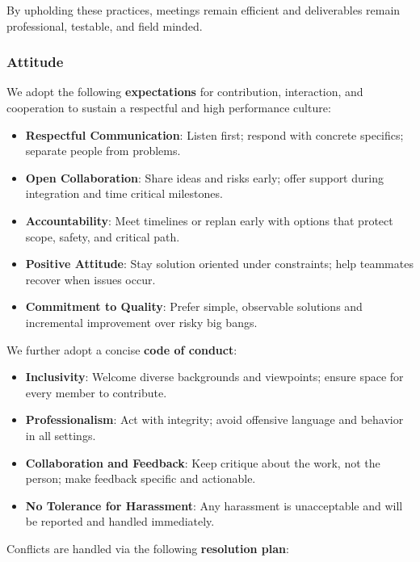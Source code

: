 \documentclass{article}
\begin{document}
\noindent
By upholding these practices, meetings remain efficient and deliverables remain
professional, testable, and field minded.

\subsubsection*{\color{blue}Attitude}

We adopt the following \textbf{expectations} for contribution, interaction, and
cooperation to sustain a respectful and high performance culture:

\begin{itemize}
  \item \textbf{Respectful Communication}: Listen first; respond with concrete
    specifics; separate people from problems.
  \item \textbf{Open Collaboration}: Share ideas and risks early; offer support
    during integration and time critical milestones.
  \item \textbf{Accountability}: Meet timelines or replan early with options
    that protect scope, safety, and critical path.
  \item \textbf{Positive Attitude}: Stay solution oriented under constraints;
    help teammates recover when issues occur.
  \item \textbf{Commitment to Quality}: Prefer simple, observable solutions and
    incremental improvement over risky big bangs.
\end{itemize}

\noindent
We further adopt a concise \textbf{code of conduct}:

\begin{itemize}
  \item \textbf{Inclusivity}: Welcome diverse backgrounds and viewpoints; ensure
    space for every member to contribute.
  \item \textbf{Professionalism}: Act with integrity; avoid offensive language
    and behavior in all settings.
  \item \textbf{Collaboration and Feedback}: Keep critique about the work, not
    the person; make feedback specific and actionable.
  \item \textbf{No Tolerance for Harassment}: Any harassment is unacceptable
    and will be reported and handled immediately.
\end{itemize}

\noindent
Conflicts are handled via the following \textbf{resolution plan}:
\end{document}
